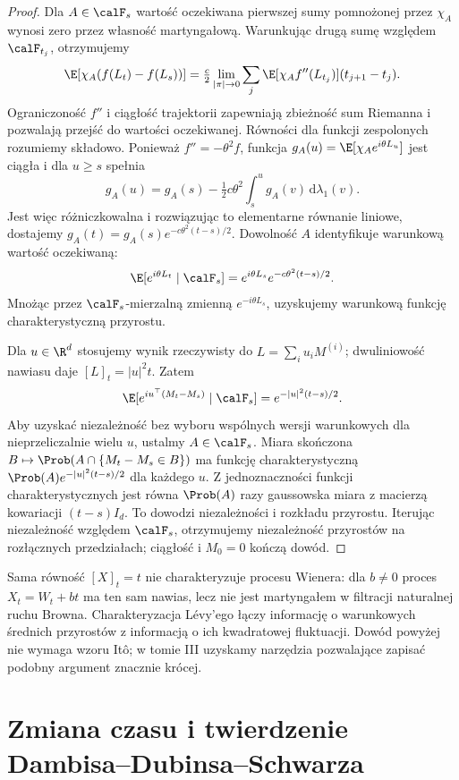 \begin{proof}
Dla $A\in\calF_s$ wartość oczekiwana pierwszej sumy
pomnożonej przez $\chi_A$ wynosi zero
przez własność martyngałową.
Warunkując drugą sumę względem $\calF_{t_j}$,
otrzymujemy
\[
\E[\chi_A(f(L_t)-f(L_s))]
=\tfrac c2\lim_{|\pi|\to0}
\sum_j\E[\chi_A f''(L_{t_j})](t_{j+1}-t_j).
\]
Ograniczoność $f''$ i ciągłość trajektorii
zapewniają zbieżność sum Riemanna i pozwalają
przejść do wartości oczekiwanej.
Równości dla funkcji zespolonych rozumiemy
składowo. Ponieważ $f''=-\theta^2 f$,
funkcja $g_A(u)=\E[\chi_A e^{i\theta L_u}]$
jest ciągła i dla $u\ge s$ spełnia
\[
g_A(u)=g_A(s)-\tfrac12c\theta^2
\int_s^u g_A(v)\,\mathrm d\lambda_1(v).
\]
Jest więc różniczkowalna i rozwiązując to
elementarne równanie liniowe, dostajemy
$g_A(t)=g_A(s)e^{-c\theta^2(t-s)/2}$.
Dowolność $A$ identyfikuje warunkową
wartość oczekiwaną:
\[
\E[e^{i\theta L_t}\mid\calF_s]
=e^{i\theta L_s}e^{-c\theta^2(t-s)/2}.
\]
Mnożąc przez $\calF_s$-mierzalną zmienną
$e^{-i\theta L_s}$, uzyskujemy
warunkową funkcję charakterystyczną przyrostu.

Dla $u\in\R^d$ stosujemy wynik rzeczywisty
do $L=\sum_i u_i M^{(i)}$; dwuliniowość
nawiasu daje $[L]_t=|u|^2t$. Zatem
\[
\E[e^{i u^\top(M_t-M_s)}\mid\calF_s]
=e^{-|u|^2(t-s)/2}.
\]
Aby uzyskać niezależność bez wyboru wspólnych
wersji warunkowych dla nieprzeliczalnie wielu $u$,
ustalmy $A\in\calF_s$. Miara skończona
$B\mapsto\Prob(A\cap\{M_t-M_s\in B\})$
ma funkcję charakterystyczną
$\Prob(A)e^{-|u|^2(t-s)/2}$ dla każdego $u$.
Z jednoznaczności funkcji charakterystycznych
jest równa $\Prob(A)$ razy gaussowska miara
z macierzą kowariacji $(t-s)I_d$.
To dowodzi niezależności i rozkładu przyrostu.
Iterując niezależność względem $\calF_s$,
otrzymujemy niezależność przyrostów na rozłącznych
przedziałach; ciągłość i $M_0=0$ kończą dowód.
\end{proof}

\begin{uwaga}
Sama równość $[X]_t=t$ nie charakteryzuje
procesu Wienera: dla $b\ne0$ proces $X_t=W_t+bt$
ma ten sam nawias, lecz nie jest martyngałem
w filtracji naturalnej ruchu Browna.
Charakteryzacja Lévy'ego łączy informację
o warunkowych średnich przyrostów z informacją
o ich kwadratowej fluktuacji.
Dowód powyżej nie wymaga wzoru It\^o;
w tomie III uzyskamy narzędzia pozwalające
zapisać podobny argument znacznie krócej.
\end{uwaga}

\section{Zmiana czasu i twierdzenie Dambisa--Dubinsa--Schwarza}

